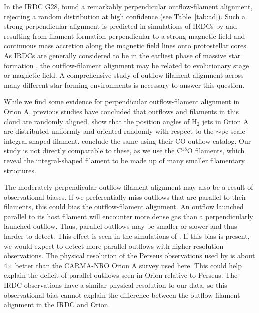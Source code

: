 \documentclass[twocolumn]{aastex63}
\begin{document}
In the IRDC G28, \citet{Kong19} found a remarkably perpendicular outflow-filament alignment, rejecting a random distribution at high confidence (see Table~\ref{tab:ad}). Such a strong perpendicular alignment is predicted in simulations of IRDCs by \citet{Li18} and \citet{Li19} resulting from filament formation perpendicular to a strong magnetic field and continuous mass accretion along the magnetic field lines onto protostellar cores. As IRDCs are generally considered to be in the earliest phase of massive star formation \citep{Rathborne06}, the outflow-filament alignment may be related to evolutionary stage or magnetic field. A comprehensive study of outflow-filament alignment across many different star forming environments is necessary to answer this question.

While we find some evidence for perpendicular outflow-filament alignment in Orion A, previous studies have concluded that outflows and filaments in this cloud are randomly aligned. \citet{Davis09} show that the position angles of H$_2$ jets in Orion A are distributed uniformly and oriented randomly with respect to the $\sim$pc-scale integral shaped filament. \citet{Tanabe:submitted} conclude the same using their CO outflow catalog. Our study is not directly comparable to these, as we use the C$^{18}$O filaments, which reveal the integral-shaped filament to be made up of many smaller filamentary structures.

The moderately perpendicular outflow-filament alignment may also be a result of observational biases. If we preferentially miss outflows that are parallel to their filaments, this could bias the outflow-filament alignment. An outflow launched parallel to its host filament will encounter more dense gas than a perpendicularly launched outflow. Thus, parallel outflows may be smaller or slower and thus harder to detect. This effect is seen in the simulations of \citet{Offner11}. If this bias is present, we would expect to detect more parallel outflows with higher resolution observations. The physical resolution of the Perseus observations used by \citet{Stephens17} is about 4$\times$ better than the CARMA-NRO Orion A survey used here. This could help explain the deficit of parallel outflows seen in Orion relative to Perseus. The \cite{Kong19} IRDC observations have a similar physical resolution to our data, so this observational bias cannot explain the difference between the outflow-filament alignment in the IRDC and Orion.
\end{document}
